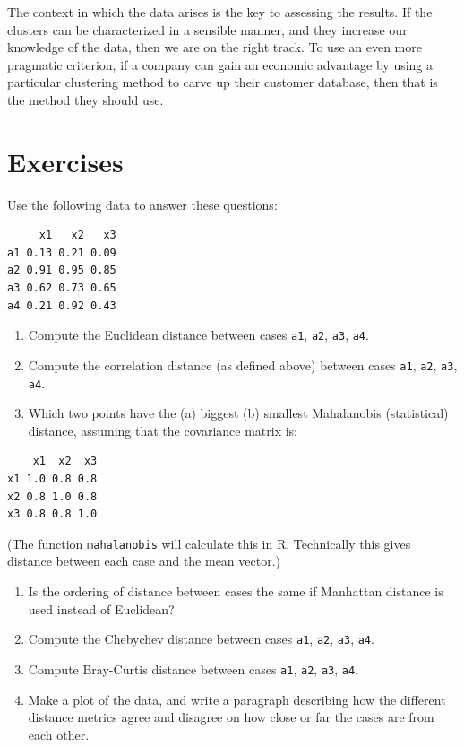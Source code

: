 \documentclass[
  letterpaper,
]{krantz}
\begin{document}
The context in which the data arises is the key to assessing the
results. If the clusters can be characterized in a sensible manner, and
they increase our knowledge of the data, then we are on the right track.
To use an even more pragmatic criterion, if a company can gain an
economic advantage by using a particular clustering method to carve up
their customer database, then that is the method they should use.

\section*{Exercises}\label{exercises-5}


Use the following data to answer these questions:

\begin{verbatim}
     x1   x2   x3
a1 0.13 0.21 0.09
a2 0.91 0.95 0.85
a3 0.62 0.73 0.65
a4 0.21 0.92 0.43
\end{verbatim}

\begin{enumerate}
\def\labelenumi{\arabic{enumi}.}
\item
  Compute the Euclidean distance between cases \texttt{a1}, \texttt{a2},
  \texttt{a3}, \texttt{a4}.
\item
  Compute the correlation distance (as defined above) between cases
  \texttt{a1}, \texttt{a2}, \texttt{a3}, \texttt{a4}.
\item
  Which two points have the (a) biggest (b) smallest Mahalanobis
  (statistical) distance, assuming that the covariance matrix is:
\end{enumerate}

\begin{verbatim}
    x1  x2  x3
x1 1.0 0.8 0.8
x2 0.8 1.0 0.8
x3 0.8 0.8 1.0
\end{verbatim}

(The function \texttt{mahalanobis} will calculate this in R. Technically
this gives distance between each case and the mean vector.)

\begin{enumerate}
\def\labelenumi{\arabic{enumi}.}
\setcounter{enumi}{3}
\item
  Is the ordering of distance between cases the same if Manhattan
  distance is used instead of Euclidean?
\item
  Compute the Chebychev distance between cases \texttt{a1}, \texttt{a2},
  \texttt{a3}, \texttt{a4}.
\item
  Compute Bray-Curtis distance between cases \texttt{a1}, \texttt{a2},
  \texttt{a3}, \texttt{a4}.
\item
  Make a plot of the data, and write a paragraph describing how the
  different distance metrics agree and disagree on how close or far the
  cases are from each other.
\end{enumerate}
\end{document}
